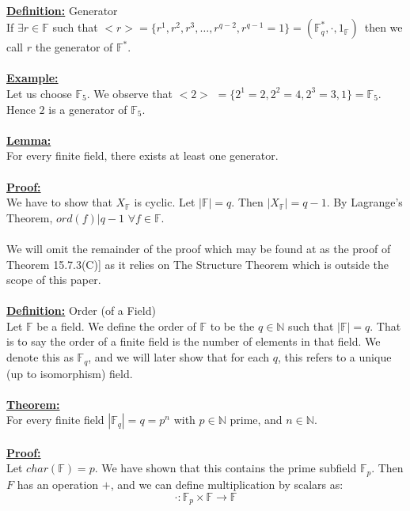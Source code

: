 \documentclass[11pt]{article}
\theoremstyle{plain}
\theoremstyle{definition}
\begin{document}
\\
\textbf{\underline{Definition:}} Generator \\
If $\exists r \in \mathbb{F}$ such that $< r > = \{ r^{1}, r^{2}, r^{3}, \dots , r^{q-2}, r^{q-1} = 1 \}= ( \mathbb{F}_{q} ^{*}, \cdot, 1_\mathbb{F} )$\, then we call $r$ the generator of $\mathbb{F}^{*}$.\\
\\
\textbf{\underline{Example:}}\\
Let us choose $\mathbb{F}_{5}$. We observe that $<2>$  $= \{2^1 =2,2^2=4,2^3=3,1\} = \mathbb{F}_{5}$. Hence $2$ is a generator of $\mathbb{F}_{5}$. \\
\\
\textbf{\underline{Lemma:}} \\
For every finite field, there exists at least one generator.\\
\\
\textbf{\underline{Proof:}} \\
We have to show that $X_\mathbb{F}$ is cyclic. Let $|\mathbb{F}| = q$. Then $| X_\mathbb{F}| = q-1$. By Lagrange's Theorem, $ord(f) | q-1$  $\forall f \in \mathbb{F}$.\\
\\
We will omit the remainder of the proof which may be found at \cite{Algebra} as the proof of Theorem 15.7.3(C)] as it relies on The Structure Theorem which is outside the scope of this paper.\\
\\
\textbf{\underline{Definition:}} Order (of a Field) \\
Let $\mathbb{F}$ be a field. We define the order of $\mathbb{F}$ to be the $q \in \mathbb{N}$ such that $| \mathbb{F} | = q$. That is to say the order of a finite field is the number of elements in that field. We denote this as $\mathbb{F}_q$, and we will later show that for each $q$, this refers to a unique (up to isomorphism) field.\\
\\
\textbf{\underline{Theorem:}} \\
For every finite field $| \mathbb{F}_q| =q= p^{n}$ with $p \in \mathbb{N} $ prime, and $n \in \mathbb{N}$. \\
\\
\textbf{\underline{Proof:}} \\
Let $char(\mathbb{F}) = p$. We have shown that this contains the prime subfield $\mathbb{F}_p$. Then $F$ has an operation $+$, and we can define multiplication by scalars as:
\begin{equation*}
\cdot: \mathbb{F}_p \times  \mathbb{F} \rightarrow \mathbb{F} 
\end{equation*}
\end{document}
